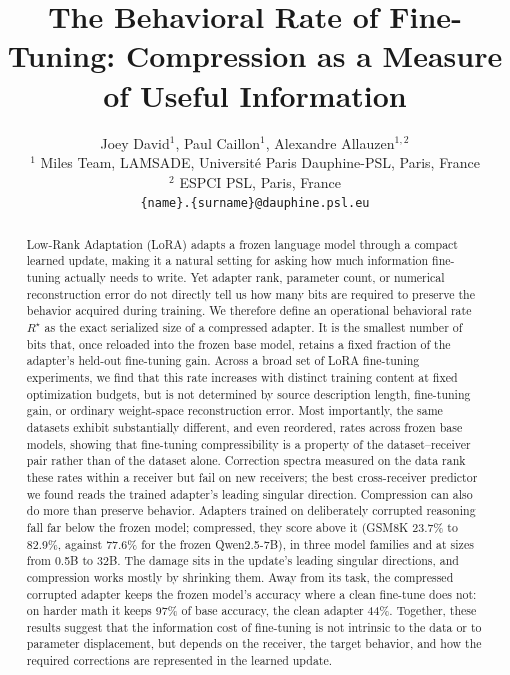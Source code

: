 \documentclass{article} %
\title{The Behavioral Rate of Fine-Tuning:
Compression as a Measure of Useful Information}
\author{Joey David$^{1}$, Paul Caillon$^{1}$, Alexandre Allauzen$^{1,2}$ \\
$^1$ Miles Team, LAMSADE, Université Paris Dauphine-PSL, Paris, France \\
$^2$ ESPCI PSL, Paris, France \\
\texttt{\{name\}.\{surname\}@dauphine.psl.eu}
}
\begin{document}
\raggedbottom

\maketitle

\begin{abstract}
Low-Rank Adaptation (LoRA) adapts a frozen language model through a compact learned update, making it a natural setting for asking how much information fine-tuning actually needs to write.
Yet adapter rank, parameter count, or numerical reconstruction error do not directly tell us how many bits are required to preserve the behavior acquired during training.
We therefore define an operational behavioral rate $R^\star$ as the exact serialized size of a compressed adapter.
It is the smallest number of bits that, once reloaded into the frozen base model, retains a fixed fraction of the adapter's held-out fine-tuning gain.
Across a broad set of LoRA fine-tuning experiments, we find that this rate increases with distinct training content at fixed optimization budgets, but is not determined by source description length, fine-tuning gain, or ordinary weight-space reconstruction error.
Most importantly, the same datasets exhibit substantially different, and even reordered, rates across frozen base models, showing that fine-tuning compressibility is a property of the dataset–receiver pair rather than of the dataset alone.
Correction spectra measured on the data rank these rates within a receiver but fail on new receivers; the best cross-receiver predictor we found reads the trained adapter's leading singular direction.
Compression can also do more than preserve behavior. Adapters trained on deliberately corrupted reasoning fall far below the frozen model; compressed, they score above it (GSM8K 23.7\% to 82.9\%, against 77.6\% for the frozen Qwen2.5-7B), in three model families and at sizes from 0.5B to 32B. The damage sits in the update's leading singular directions, and compression works mostly by shrinking them. Away from its task, the compressed corrupted adapter keeps the frozen model's accuracy where a clean fine-tune does not: on harder math it keeps 97\% of base accuracy, the clean adapter 44\%.
Together, these results suggest that the information cost of fine-tuning is not intrinsic to the data or to parameter displacement, but depends on the receiver, the target behavior, and how the required corrections are represented in the learned update.
\end{abstract}
\end{document}
